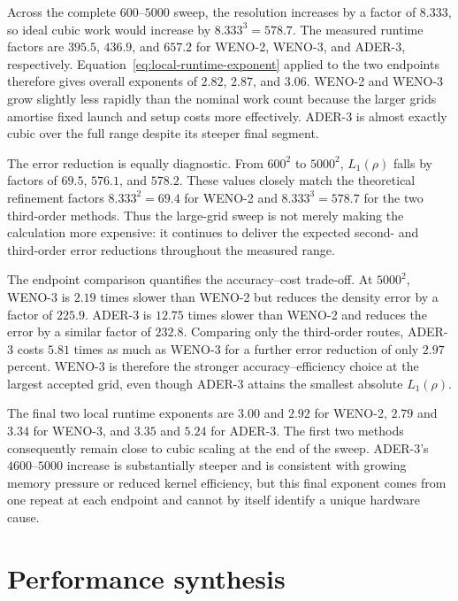 Across the complete \(600\)--\(5000\) sweep, the resolution increases by a factor of
\(8.333\), so ideal cubic work would increase by \(8.333^3=578.7\).  The measured runtime
factors are \(395.5\), \(436.9\), and \(657.2\) for WENO-2, WENO-3, and ADER-3,
respectively.  Equation~\eqref{eq:local-runtime-exponent} applied to the two endpoints
therefore gives overall exponents of \(2.82\), \(2.87\), and \(3.06\).  WENO-2 and WENO-3
grow slightly less rapidly than the nominal work count because the larger grids amortise
fixed launch and setup costs more effectively. ADER-3 is almost exactly cubic over the
full range despite its steeper final segment.

The error reduction is equally diagnostic.  From \(600^2\) to \(5000^2\),
\(L_1(\rho)\) falls by factors of \(69.5\), \(576.1\), and \(578.2\).  These values closely
match the theoretical refinement factors \(8.333^2=69.4\) for WENO-2 and
\(8.333^3=578.7\) for the two third-order methods.  Thus the large-grid sweep is not merely
making the calculation more expensive: it continues to deliver the expected second- and
third-order error reductions throughout the measured range.

The endpoint comparison quantifies the accuracy--cost trade-off.  At \(5000^2\), WENO-3
is \(2.19\) times slower than WENO-2 but reduces the density error by a factor of
\(225.9\).  ADER-3 is \(12.75\) times slower than WENO-2 and reduces the error by a similar
factor of \(232.8\).  Comparing only the third-order routes, ADER-3 costs \(5.81\) times as
much as WENO-3 for a further error reduction of only \(2.97\) percent.  WENO-3 is therefore
the stronger accuracy--efficiency choice at the largest accepted grid, even though ADER-3
attains the smallest absolute \(L_1(\rho)\).

The final two local runtime exponents are \(3.00\) and \(2.92\) for WENO-2,
\(2.79\) and \(3.34\) for WENO-3, and \(3.35\) and \(5.24\) for ADER-3.  The first two
methods consequently remain close to cubic scaling at the end of the sweep.  ADER-3's
\(4600\)--\(5000\) increase is substantially steeper and is consistent with growing memory
pressure or reduced kernel efficiency, but this final exponent comes from one repeat at
each endpoint and cannot by itself identify a unique hardware cause.

\section{Performance synthesis}

